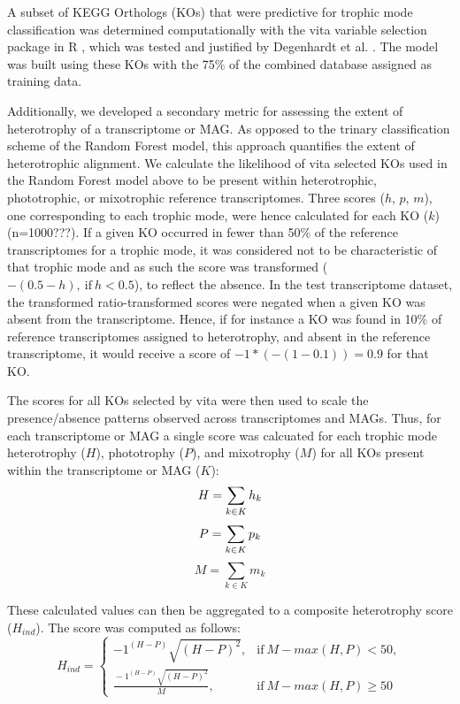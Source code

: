 \documentclass[12pt]{article}
\numberwithin{equation}{section}
\begin{document}
A subset of KEGG Orthologs (KOs) that were predictive for trophic mode classification was determined computationally with the vita variable selection package in R \citep{Janitza_2016}, which was tested and justified by Degenhardt et al. \citet{Degenhardt_2017}. The model was built using these KOs with the 75\% of the combined database assigned as training data.

Additionally, we developed a secondary metric for assessing the extent of heterotrophy of a transcriptome or MAG. As opposed to the trinary classification scheme of the Random Forest model, this approach quantifies the extent of heterotrophic alignment. We calculate the likelihood of vita selected KOs used in the Random Forest model above to be present within heterotrophic, phototrophic, or mixotrophic reference transcriptomes. Three scores ($h$, $p$, $m$), one corresponding to each trophic mode, were hence calculated for each KO ($k$) (n=1000???). If  a given KO occurred in fewer than 50\% of the reference transcriptomes for a trophic mode, it was considered not to be characteristic of that trophic mode and as such the score was transformed ($-(0.5 - h),\ \text{if} \ h<0.5$), to reflect the absence. In the test transcriptome dataset, the transformed ratio-transformed scores were negated when a given KO was absent from the transcriptome. Hence, if for instance a KO was found in 10\% of reference transcriptomes assigned to heterotrophy, and absent in the reference transcriptome, it would receive a score of $-1 * (-(1-0.1)) = 0.9$ for that KO.

The scores for all KOs selected by vita were then used to scale the presence/absence patterns observed across transcriptomes and MAGs. Thus, for each transcriptome or MAG a single score was calcuated for each trophic mode heterotrophy ($H$), phototrophy ($P$), and mixotrophy ($M$) for all KOs present within the transcriptome or MAG ($K$):
  \begin{equation}\label{eq:sum}
  H = \sum_{k \in K} h_k \\ 
  \end{equation}
  \begin{equation}
    P = \sum_{k \in K} p_k \\
\end{equation}
  \begin{equation}
    M = \sum_{k \in K} m_k
\end{equation}

These calculated values can then be aggregated to a composite heterotrophy score ($H_{ind}$). The score was computed as follows: 
\begin{equation}\label{eq:hind}
   H_{ind}=
    \begin{cases}
      -1^{(H-P)}\sqrt{(H-P)^2}, & \text{if}\ M-max(H,P)<50, \\
      \frac{{}-1^{(H-P)}\sqrt{(H-P)^2}}{M}, & \text{if} \ M-max(H,P) \geq 50
    \end{cases}
  \end{equation}
  
\end{document}
